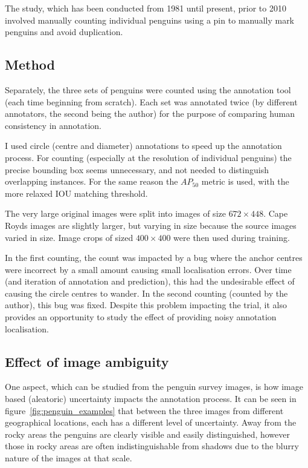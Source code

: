The study, which has been conducted from 1981 until present, prior to 2010 involved manually counting individual penguins using a pin to manually mark penguins and avoid duplication. 


\subsection {Method}

Separately, the three sets of penguins were counted using the annotation tool (each time beginning from scratch). Each set was annotated twice (by different annotators, the second being the author) for the purpose  of comparing human consistency in annotation.

I used circle (centre and diameter) annotations to speed up the annotation process. For counting (especially at the resolution of individual penguins) the precise bounding box seems unnecessary, and not needed to distinguish overlapping instances. For the same reason the $AP_{50}$ metric is used, with the more relaxed \gls{IOU} matching threshold.

The very large original images were split into images of size $ 672\times448 $. Cape Royds images are slightly larger, but varying in size because the source images varied in size. Image crops of sized $ 400\times400 $ were then used during training.

In the first counting, the count was impacted by a bug where the anchor centres were incorrect by a small amount causing small localisation errors. Over time (and iteration of annotation and prediction), this had the undesirable effect of causing the circle centres to wander. In the second counting (counted by the author), this bug was fixed. Despite this problem impacting the trial, it also provides an opportunity to study the effect of providing noisy annotation localisation.

\subsection {Effect of image ambiguity}

One aspect, which can be studied from the penguin survey images, is how image based (aleatoric) uncertainty impacts the annotation process. It can be seen in figure~\ref{fig:penguin_examples} that between the three images from different geographical locations, each has a different level of uncertainty. Away from the rocky areas the penguins are clearly visible and easily distinguished, however those in rocky areas are often indistinguishable from shadows due to the blurry nature of the images at that scale.

